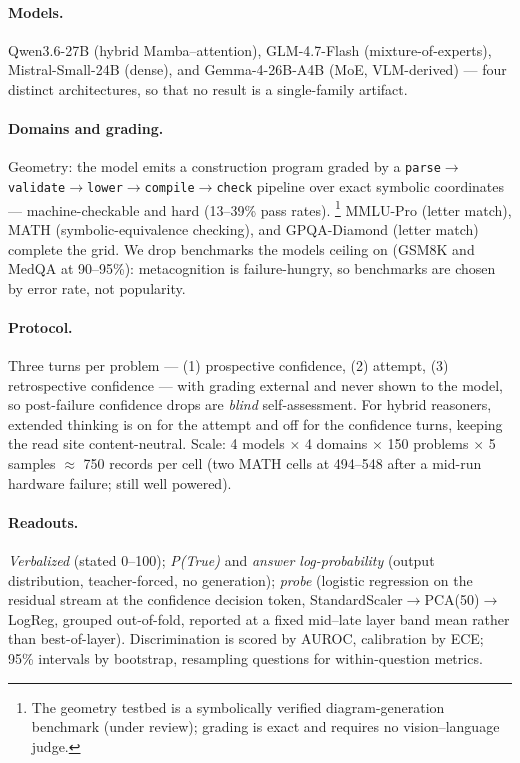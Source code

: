 \documentclass{article}
\begin{document}
\paragraph{Models.}
Qwen3.6-27B (hybrid Mamba--attention), GLM-4.7-Flash (mixture-of-experts), Mistral-Small-24B (dense), and Gemma-4-26B-A4B (MoE, VLM-derived) --- four distinct architectures, so that no result is a single-family artifact.

\paragraph{Domains and grading.}
Geometry: the model emits a construction program graded by a \texttt{parse$\to$validate$\to$lower$\to$compile$\to$check} pipeline over exact symbolic coordinates --- machine-checkable and hard (13--39\% pass rates).%
\footnote{The geometry testbed is a symbolically verified diagram-generation benchmark (under review); grading is exact and requires no vision--language judge.}
MMLU-Pro (letter match), MATH (symbolic-equivalence checking), and GPQA-Diamond (letter match) complete the grid.
We drop benchmarks the models ceiling on (GSM8K and MedQA at 90--95\%): metacognition is failure-hungry, so benchmarks are chosen by error rate, not popularity.

\paragraph{Protocol.}
Three turns per problem --- (1) prospective confidence, (2) attempt, (3) retrospective confidence --- with grading external and never shown to the model, so post-failure confidence drops are \emph{blind} self-assessment.
For hybrid reasoners, extended thinking is on for the attempt and off for the confidence turns, keeping the read site content-neutral.
Scale: 4 models $\times$ 4 domains $\times$ 150 problems $\times$ 5 samples $\approx$ 750 records per cell (two MATH cells at 494--548 after a mid-run hardware failure; still well powered).

\paragraph{Readouts.}
\emph{Verbalized} (stated 0--100); \emph{P(True)} and \emph{answer log-probability} (output distribution, teacher-forced, no generation); \emph{probe} (logistic regression on the residual stream at the confidence decision token, StandardScaler$\to$PCA(50)$\to$LogReg, grouped out-of-fold, reported at a fixed mid--late layer band mean rather than best-of-layer).
Discrimination is scored by AUROC, calibration by ECE; 95\% intervals by bootstrap, resampling questions for within-question metrics.
\end{document}
